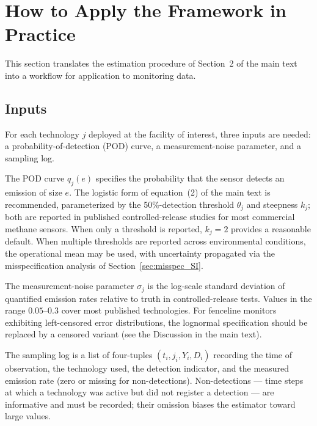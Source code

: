 \documentclass[11pt]{article}
\newcommand{\new}[1]{#1}
\begin{document}
\section{How to Apply the Framework in Practice}
\label{sec:howto_SI}

\new{This section translates the estimation procedure of Section~2 of the main text into a workflow for application to monitoring data.}

\subsection{Inputs}
\new{For each technology $j$ deployed at the facility of interest, three inputs are needed: a probability-of-detection (POD) curve, a measurement-noise parameter, and a sampling log.}

\new{The POD curve $q_j(e)$ specifies the probability that the sensor detects an emission of size $e$. The logistic form of equation~(2) of the main text is recommended, parameterized by the 50\%-detection threshold $\theta_j$ and steepness $k_j$; both are reported in published controlled-release studies for most commercial methane sensors. When only a threshold is reported, $k_j = 2$ provides a reasonable default. When multiple thresholds are reported across environmental conditions, the operational mean may be used, with uncertainty propagated via the misspecification analysis of Section~\ref{sec:misspec_SI}.}

\new{The measurement-noise parameter $\sigma_j$ is the log-scale standard deviation of quantified emission rates relative to truth in controlled-release tests. Values in the range $0.05$--$0.3$ cover most published technologies. For fenceline monitors exhibiting left-censored error distributions, the lognormal specification should be replaced by a censored variant (see the Discussion in the main text).}

\new{The sampling log is a list of four-tuples $(t_i, j_i, Y_i, D_i)$ recording the time of observation, the technology used, the detection indicator, and the measured emission rate (zero or missing for non-detections). Non-detections — time steps at which a technology was active but did not register a detection — are informative and must be recorded; their omission biases the estimator toward large values.}
\end{document}
